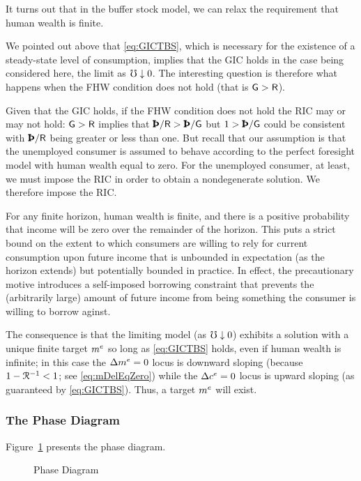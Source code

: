\message{ !name(TractableBufferStock.tex)}\documentclass{handout}
\begin{document}
It turns out that in the buffer stock model, we can relax the requirement that human wealth is finite.  

We pointed out above that \eqref{eq:GICTBS}, which is necessary for the existence of a steady-state level of consumption, implies that the GIC holds in the case being considered here, the limit as $\mho \downarrow 0$.  The interesting question is therefore what happens when the FHW condition does not hold (that is $\mathsf{G} > \mathsf{R}$).  

Given that the GIC holds, if the FHW condition does not hold the RIC may or may not hold:  $\mathsf{G} > \mathsf{R}$ implies that $\Pat/\Rfree > \Pat/\WGro$ but $1 > \Pat/\WGro$ could be consistent with $\Pat/\Rfree$ being greater or less than one.  But recall that our assumption is that the unemployed consumer is assumed to behave according to the perfect foresight model with human wealth equal to zero.  For the unemployed consumer, at least, we must impose the RIC in order to obtain a nondegenerate solution.  We therefore impose the RIC.

For any finite horizon, human wealth is finite, and there is a positive probability that income will be zero over the remainder of the horizon.  This puts a strict bound on the extent to which consumers are willing to rely for current consumption upon future income that is unbounded in expectation (as the horizon extends) but potentially bounded in practice.  In effect, the precautionary motive introduces a self-imposed borrowing constraint that prevents the (arbitrarily large) amount of future income from being something the consumer is willing to borrow aginst.

The consequence is that the limiting model (as $\mho \downarrow 0$) exhibits a solution with a unique finite target $m^{e}$ so long as \eqref{eq:GICTBS} holds, even if human wealth is infinite; in this case the $\Delta m^{e}=0$ locus is downward sloping (because $1-\mathcal{R}^{-1}<1$; see \eqref{eq:mDelEqZero}) while the $\Delta c^{e}=0$ locus is upward sloping (as guaranteed by \eqref{eq:GICTBS}).  Thus, a target $m^{e}$ will exist.



\subsubsection{The Phase Diagram}


Figure~\ref{fig:PhaseDiag} presents the phase diagram.
\begin{figure}
\caption{Phase Diagram}\label{fig:PhaseDiag}
\end{figure}
\end{document}
